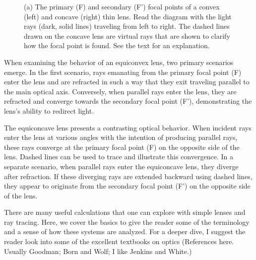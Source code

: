 \documentclass[
  letterpaper,
]{book}
\begin{document}
\begin{figure}


\caption{\label{fig-thinlens-focalpoints}(a) The primary (F) and
secondary (F') focal points of a convex (left) and concave (right) thin
lens. Read the diagram with the light rays (dark, solid lines) traveling
from left to right. The dashed lines drawn on the concave lens are
virtual rays that are shown to clarify how the focal point is found. See
the text for an explanation.}

\end{figure}%

When examining the behavior of an equiconvex lens, two primary scenarios
emerge. In the first scenario, rays emanating from the primary focal
point (F) enter the lens and are refracted in such a way that they exit
traveling parallel to the main optical axis. Conversely, when parallel
rays enter the lens, they are refracted and converge towards the
secondary focal point (F'), demonstrating the lens's ability to redirect
light.

The equiconcave lens presents a contrasting optical behavior. When
incident rays enter the lens at various angles with the intention of
producing parallel rays, these rays converge at the primary focal point
(F) on the opposite side of the lens. Dashed lines can be used to trace
and illustrate this convergence. In a separate scenario, when parallel
rays enter the equiconcave lens, they diverge after refraction. If these
diverging rays are extended backward using dashed lines, they appear to
originate from the secondary focal point (F') on the opposite side of
the lens.

There are many useful calculations that one can explore with simple
lenses and ray tracing. Here, we cover the basics to give the reader
some of the terminology and a sense of how these systems are analyzed.
For a deeper dive, I suggest the reader look into some of the excellent
textbooks on optics (References here. Usually Goodman; Born and Wolf; I
like Jenkins and White.)
\end{document}
